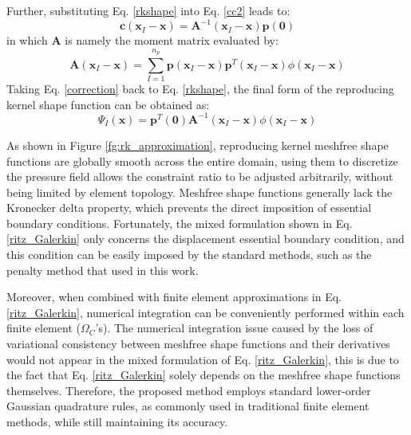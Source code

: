 Further, substituting Eq. \ref{rkshape} into Eq. \eqref{cc2} leads to:
\begin{equation}\label{correction}
\boldsymbol{c}(\boldsymbol{x}_I-\boldsymbol{x}) = \boldsymbol{A}^{-1}(\boldsymbol{x}_I-\boldsymbol{x}) \boldsymbol{p}(\boldsymbol{0})
\end{equation}
in which $\boldsymbol{A}$ is namely the moment matrix evaluated by:
\begin{equation}
\boldsymbol{A}(\boldsymbol{x}_I-\boldsymbol{x}) = \sum_{I=1}^{n_p} \boldsymbol{p}(\boldsymbol{x}_I-\boldsymbol{x}) \boldsymbol{p}^T(\boldsymbol{x}_I-\boldsymbol{x}) \phi(\boldsymbol{x}_I-\boldsymbol{x})
\end{equation}
Taking Eq. \eqref{correction} back to Eq. \eqref{rkshape}, the final form of the reproducing kernel shape function can be obtained as:
\begin{equation}
\Psi_I(\boldsymbol{x}) = \boldsymbol{p}^T(\boldsymbol{0}) \boldsymbol{A}^{-1}(\boldsymbol{x}_I-\boldsymbol{x}) \phi(\boldsymbol{x}_I-\boldsymbol{x})
\end{equation}

As shown in Figure \ref{fg:rk_approximation},
reproducing kernel meshfree shape functions are globally smooth across the entire domain,
using them to discretize the pressure field allows the constraint ratio to be adjusted arbitrarily, without being limited by element topology.
Meshfree shape functions generally lack the Kronecker delta property, which prevents the direct imposition of essential boundary conditions.
Fortunately, the mixed formulation shown in Eq. \ref{ritz_Galerkin} only concerns the displacement essential boundary condition, and this condition can be easily imposed by the standard methods, such as the penalty method that used in this work.

Moreover,
when combined with finite element approximations in Eq. \ref{ritz_Galerkin},
numerical integration can be conveniently performed within each finite element ($\Omega_C$'s).
The numerical integration issue caused by the loss of variational consistency between meshfree shape functions and their derivatives \cite{wu2021} would not appear in the mixed formulation of Eq. \ref{ritz_Galerkin}, this is due to the fact that Eq. \ref{ritz_Galerkin} solely depends on the meshfree shape functions themselves.
Therefore, the proposed method employs standard lower-order Gaussian quadrature rules, as commonly used in traditional finite element methods, while still maintaining its accuracy.

